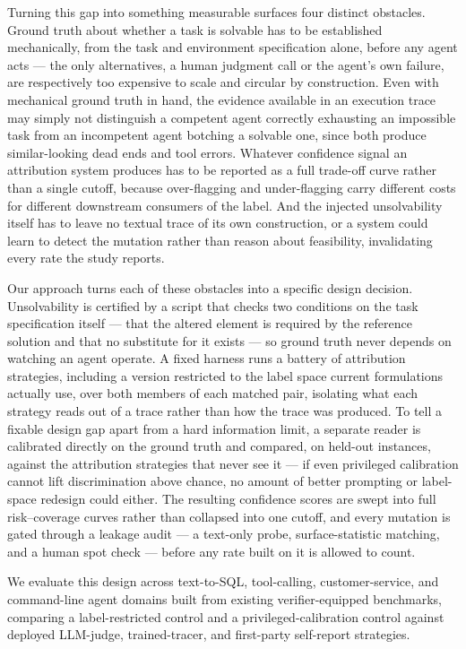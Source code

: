 \documentclass[11pt]{article}
\begin{document}
Turning this gap into something measurable surfaces four distinct obstacles. Ground truth about whether a task is solvable has to be established mechanically, from the task and environment specification alone, before any agent acts --- the only alternatives, a human judgment call or the agent's own failure, are respectively too expensive to scale and circular by construction. Even with mechanical ground truth in hand, the evidence available in an execution trace may simply not distinguish a competent agent correctly exhausting an impossible task from an incompetent agent botching a solvable one, since both produce similar-looking dead ends and tool errors. Whatever confidence signal an attribution system produces has to be reported as a full trade-off curve rather than a single cutoff, because over-flagging and under-flagging carry different costs for different downstream consumers of the label. And the injected unsolvability itself has to leave no textual trace of its own construction, or a system could learn to detect the mutation rather than reason about feasibility, invalidating every rate the study reports.

Our approach turns each of these obstacles into a specific design decision. Unsolvability is certified by a script that checks two conditions on the task specification itself --- that the altered element is required by the reference solution and that no substitute for it exists --- so ground truth never depends on watching an agent operate. A fixed harness runs a battery of attribution strategies, including a version restricted to the label space current formulations actually use, over both members of each matched pair, isolating what each strategy reads out of a trace rather than how the trace was produced. To tell a fixable design gap apart from a hard information limit, a separate reader is calibrated directly on the ground truth and compared, on held-out instances, against the attribution strategies that never see it --- if even privileged calibration cannot lift discrimination above chance, no amount of better prompting or label-space redesign could either. The resulting confidence scores are swept into full risk--coverage curves rather than collapsed into one cutoff, and every mutation is gated through a leakage audit --- a text-only probe, surface-statistic matching, and a human spot check --- before any rate built on it is allowed to count.

We evaluate this design across text-to-SQL, tool-calling, customer-service, and command-line agent domains built from existing verifier-equipped benchmarks, comparing a label-restricted control and a privileged-calibration control against deployed LLM-judge, trained-tracer, and first-party self-report strategies.
\end{document}
